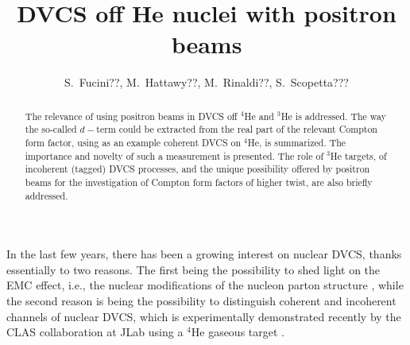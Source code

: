 \documentclass[times, twoside]{PosWhiPap}
\begin{document}
\title{DVCS off He nuclei with positron beams}

\author[]
{S.~Fucini??, M.~Hattawy??, M.~Rinaldi??, S.~Scopetta???  }


\maketitle

\begin{abstract}
The relevance of using positron beams in DVCS off $^4$He and $^3$He 
   is addressed. The way the so-called $d-$term could be extracted from the 
   real part of the relevant Compton form factor, using as an example coherent 
   DVCS on $^4$He, is summarized. The importance and novelty of such a 
   measurement is presented. The role of $^3$He targets, of incoherent (tagged) 
   DVCS processes, and the unique possibility offered by positron beams for the 
   investigation of Compton form factors of higher twist, are also  briefly 
   addressed.
\end {abstract}




In the last few years, there has been a growing interest on nuclear DVCS, 
   thanks essentially to two reasons. The first being the possibility to shed 
   light on the EMC effect, i.e., the nuclear modifications of the nucleon 
   parton structure \cite{Dupre:2015jha, Cloet:2019mql}, while the second 
   reason is being the possibility to distinguish coherent and incoherent 
   channels of nuclear DVCS, which is experimentally demonstrated recently by 
   the CLAS collaboration at JLab using a $^4$He gaseous target 
   \cite{Hattawy:2017woc, Hattawy:2018liu}.
\end{document}
